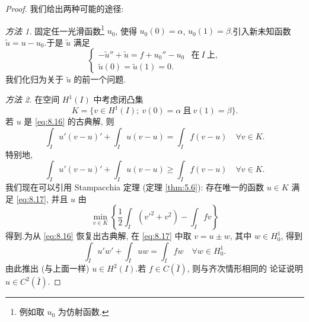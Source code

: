 \begin{proof}
我们给出两种可能的途径:

\emph{方法 1.} 固定任一光滑函数\footnote{例如取 $u_0$ 为仿射函数.} $u_0$,
使得 $u_0(0)=\alpha$, $u_0(1)=\beta$.引入新未知函数 $\tilde u=u-u_0$.于是
$\tilde u$ 满足
\begin{equation*}
\begin{cases}
-\tilde u''+\tilde u=f+u_0''-u_0 & \text{在}\ I\ \text{上},\\
\tilde u(0)=\tilde u(1)=0.
\end{cases}
\end{equation*}
我们化归为关于 $\tilde u$ 的前一个问题.

\emph{方法 2.} 在空间 $H^1(I)$ 中考虑闭凸集
\begin{equation*}
K=\{v\in H^1(I);\ v(0)=\alpha\ \text{且}\ v(1)=\beta\}.
\end{equation*}
若 $u$ 是 \eqref{eq:8.16} 的古典解, 则
\begin{equation*}
\int_I u'(v-u)'+\int_I u(v-u)=\int_I f(v-u)\quad\forall v\in K.
\end{equation*}
特别地,
\begin{equation}
\int_I u'(v-u)'+\int_I u(v-u)\ge\int_I f(v-u)\quad\forall v\in K.
\label{eq:8.17}
\end{equation}
我们现在可以引用 Stampacchia 定理 (定理  \ref{thm:5.6}): 存在唯一的函数
$u\in K$ 满足 \eqref{eq:8.17}, 并且 $u$ 由
\begin{equation*}
\min_{v\in K}\left\{\frac12\int_I(v'^2+v^2)-\int_I fv\right\}
\end{equation*}
得到.为从 \eqref{eq:8.16} 恢复出古典解, 在 \eqref{eq:8.17} 中取
$v=u\pm w$, 其中 $w\in H_0^1$, 得到
\begin{equation*}
\int_I u'w'+\int_I uw=\int_I fw\quad\forall w\in H_0^1.
\end{equation*}
由此推出 (与上面一样) $u\in H^2(I)$.若 $f\in C(\bar I)$, 则与齐次情形相同的
论证说明 $u\in C^2(\bar I)$.
\end{proof}

